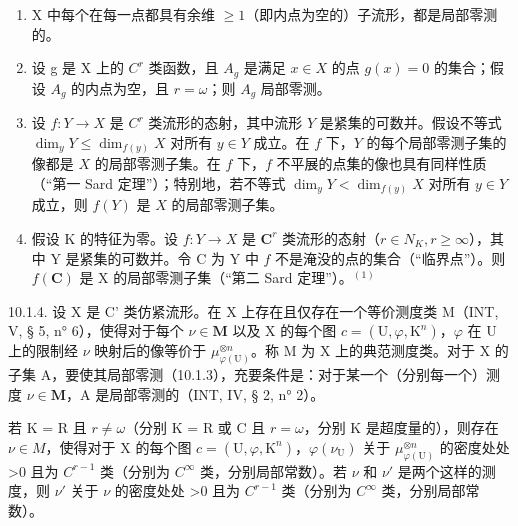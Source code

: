 \begin{enumerate}
\def\labelenumi{\alph{enumi})}
\item
  X 中每个在每一点都具有余维 \(\geqslant1\)（即内点为空的）子流形，都是局部零测的。
\item
  设 g 是 X 上的 \(C^{r}\) 类函数，且 \(A_{g}\) 是满足 \(x \in X\) 的点 \(g(x) = 0\) 的集合；假设 \(A_{g}\) 的内点为空，且 \(r = \omega\)；则 \(A_{g}\) 局部零测。
\item
  设 \(f: Y \to X\) 是 \(C^{r}\) 类流形的态射，其中流形 \(Y\) 是紧集的可数并。假设不等式 \(\dim_{y} Y \leqslant \dim_{f(y)} X\) 对所有 \(y \in Y\) 成立。在 \(f\) 下，\(Y\) 的每个局部零测子集的像都是 \(X\) 的局部零测子集。在 \(f\) 下，\(f\) 不平展的点集的像也具有同样性质（“第一 Sard 定理”）；特别地，若不等式 \(\dim_{y} Y < \dim_{f(y)} X\) 对所有 \(y \in Y\) 成立，则 \(f(Y)\) 是 \(X\) 的局部零测子集。
\item
  假设 K 的特征为零。设 \(f\colon Y\to X\) 是 \(\mathbf{C}^{r}\) 类流形的态射（\(r\in N_{K}, r\geqslant\infty\)），其中 Y 是紧集的可数并。令 C 为 Y 中 \(f\) 不是淹没的点的集合（“临界点”）。则 \(f(\mathbf{C})\) 是 X 的局部零测子集（“第二 Sard 定理”）。\(^{(1)}\)
\end{enumerate}

10.1.4. 设 X 是 C' 类仿紧流形。在 X 上存在且仅存在一个等价测度类 M（INT, V, § 5, n° 6），使得对于每个 \(\nu \in \mathbf{M}\) 以及 X 的每个图 \(c = (\mathrm{U}, \varphi, \mathrm{K}^n)\)，\(\varphi\) 在 U 上的限制经 \(\nu\) 映射后的像等价于 \(\mu_{\varphi(\mathrm{U})}^{\otimes n}\)。称 M 为 X 上的典范测度类。对于 X 的子集 A，要使其局部零测（10.1.3），充要条件是：对于某一个（分别每一个）测度 \(\nu \in \mathbf{M}\)，A 是局部零测的（INT, IV, § 2, n° 2）。

若 K = R 且 \(r \neq \omega\)（分别 K = R 或 C 且 \(r = \omega\)，分别 K 是超度量的），则存在 \(\nu \in M\)，使得对于 X 的每个图 \(c = (\mathrm{U}, \varphi, \mathrm{K}^{n})\)，\(\varphi(\nu_{\mathrm{U}})\) 关于 \(\mu_{\varphi(\mathrm{U})}^{\otimes n}\) 的密度处处 \textgreater0 且为 \(C^{r-1}\) 类（分别为 \(C^{\infty}\) 类，分别局部常数）。若 \(\nu\) 和 \(\nu'\) 是两个这样的测度，则 \(\nu'\) 关于 \(\nu\) 的密度处处 \textgreater0 且为 \(C^{r-1}\) 类（分别为 \(C^{\infty}\) 类，分别局部常数）。

